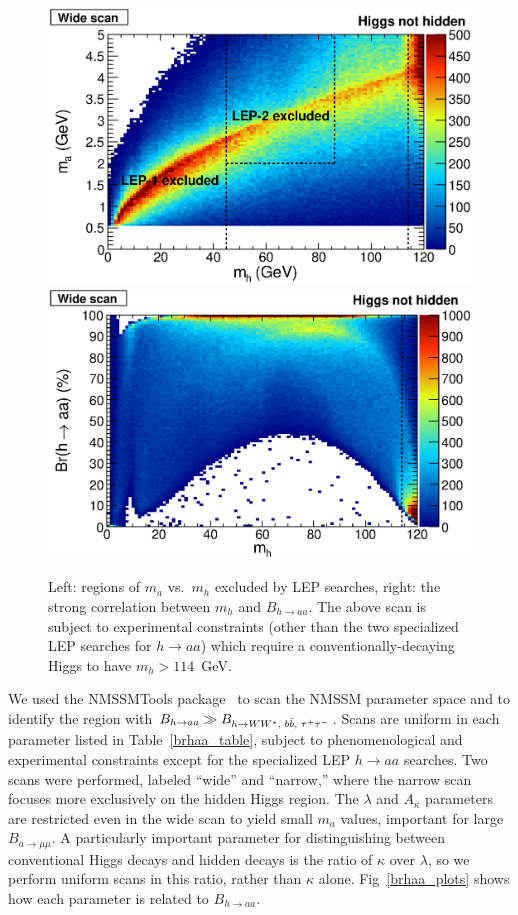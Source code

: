 \documentclass[aps,prd,onecolumn,superscriptaddress,showpacs]{revtex4}
\begin{document}
\begin{figure}[htb]
\begin{center}
\includegraphics[width=0.45\linewidth]{plots/mass_exclusion.eps}
\includegraphics[width=0.45\linewidth]{plots/mh_brhaa.eps}
\caption{Left: regions of $m_a$ vs.\ $m_h$ excluded by LEP searches,
  right: the strong correlation between $m_h$ and $B_{h \to aa}$.  The above scan is subject to experimental constraints (other
  than the two specialized LEP searches for $h\to aa$) which require a
  conventionally-decaying Higgs to have $m_h >
  114$~GeV. \label{mass_exclusion}}
\end{center}
\end{figure}

We used the NMSSMTools
package~\cite{nmssmtools1,nmssmtools2,nmssmtools3} to scan the NMSSM
parameter space and to identify the region with $B_{h \to aa}
\gg B_{h \to WW^*\mbox{\scriptsize, } b\bar{b}\mbox{\scriptsize, }\tau^+\tau^-}$.
Scans are uniform in each parameter listed in Table~\ref{brhaa_table},
subject to phenomenological and experimental constraints except for
the specialized LEP $h\to aa$ searches.  Two scans were performed,
labeled ``wide'' and ``narrow,'' where the narrow scan focuses more
exclusively on the hidden Higgs region.  The $\lambda$ and $A_\kappa$
parameters are restricted even in the wide scan to yield small $m_a$
values, important for large $B_{a\to\mu\mu}$.  A particularly
important parameter for distinguishing between conventional Higgs
decays and hidden decays is the ratio of $\kappa$ over $\lambda$, so
we perform uniform scans in this ratio, rather than $\kappa$ alone.
Fig~\ref{brhaa_plots} shows how each parameter is related to
$B_{h \to aa}$.
\end{document}
